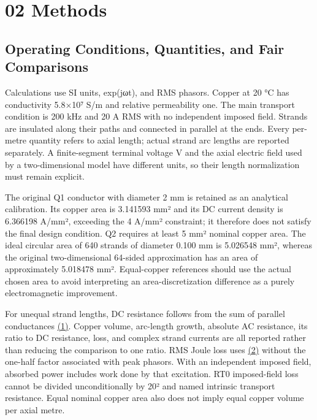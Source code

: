 \documentclass[11pt]{article}
\begin{document}
\FloatBarrier
\section*{02 Methods}
\hypertarget{chapter-02}{}
\subsection*{Operating Conditions, Quantities, and Fair Comparisons}
\hypertarget{02.conventions.heading}{}
Calculations use SI units, exp(jωt), and RMS phasors. Copper at 20 °C has conductivity 5.8×10⁷ S/m and relative permeability one. The main transport condition is 200 kHz and 20 A RMS with no independent imposed field. Strands are insulated along their paths and connected in parallel at the ends. Every per-metre quantity refers to axial length; actual strand arc lengths are reported separately. A finite-segment terminal voltage V and the axial electric field used by a two-dimensional model have different units, so their length normalization must remain explicit.


The original Q1 conductor with diameter 2 mm is retained as an analytical calibration. Its copper area is 3.141593 mm² and its DC current density is 6.366198 A/mm², exceeding the 4 A/mm² constraint; it therefore does not satisfy the final design condition. Q2 requires at least 5 mm² nominal copper area. The ideal circular area of 640 strands of diameter 0.100 mm is 5.026548 mm², whereas the original two-dimensional 64-sided approximation has an area of approximately 5.018478 mm². Equal-copper references should use the actual chosen area to avoid interpreting an area-discretization difference as a purely electromagnetic improvement.


For unequal strand lengths, DC resistance follows from the sum of parallel conductances \href{paper_en_single.pdf#E01}{(1)}. Copper volume, arc-length growth, absolute AC resistance, its ratio to DC resistance, loss, and complex strand currents are all reported rather than reducing the comparison to one ratio. RMS Joule loss uses \href{paper_en_single.pdf#E02}{(2)} without the one-half factor associated with peak phasors. With an independent imposed field, absorbed power includes work done by that excitation. RT0 imposed-field loss cannot be divided unconditionally by 20² and named intrinsic transport resistance. Equal nominal copper area also does not imply equal copper volume per axial metre.
\end{document}
